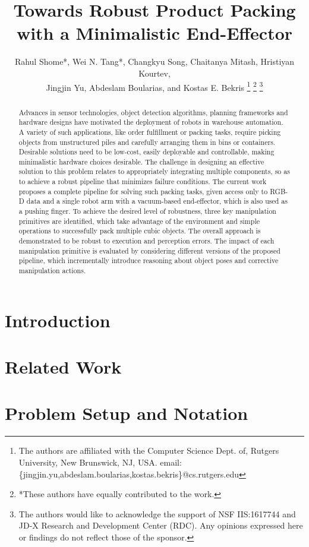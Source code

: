 \documentclass[letterpaper, 10 pt, conference]{Format/ieeeconf}  %
\title{\LARGE \bf
Towards Robust Product Packing with a Minimalistic End-Effector
}
\author{Rahul Shome*, Wei N. Tang*, Changkyu Song,  Chaitanya Mitash, Hristiyan Kourtev,\\  Jingjin Yu, Abdeslam Boularias, and Kostas E. Bekris%
\thanks{The authors are affiliated with the Computer Science Dept. of, Rutgers University, New Brunswick, NJ, USA. email:\{jingjin.yu,abdeslam.boularias,kostas.bekris\}@cs.rutgers.edu}%
\thanks{*These authors have equally contributed to the work.}%
\thanks{The authors would like to acknowledge the support of NSF IIS:1617744 and JD-X Research and Development Center (RDC). Any opinions expressed here or findings do not reflect those of the sponsor.}}
\begin{document}
\maketitle
\thispagestyle{empty}
\pagestyle{empty}

\vspace*{-4mm}
\begin{abstract}

Advances in sensor technologies, object detection algorithms, planning frameworks and hardware designs have motivated the deployment of robots in warehouse automation. A variety of such applications, like order fulfillment or packing tasks, require picking objects from unstructured piles and carefully arranging them in bins or containers. Desirable solutions need to be low-cost, easily deployable and controllable, making minimalistic hardware choices desirable. The challenge in designing an effective solution to this problem relates to appropriately integrating multiple components, so as to achieve a robust pipeline that minimizes failure conditions. The current work proposes a complete pipeline for solving such packing tasks, given access only to RGB-D data and a single robot arm with a vacuum-based end-effector, which is also used as a pushing finger. To achieve the desired level of robustness, three key manipulation primitives are identified, which take advantage of the environment and simple operations to successfully pack multiple cubic objects. The overall approach is demonstrated to be robust to execution and perception errors. The impact of each manipulation primitive is evaluated by considering different versions of the proposed pipeline, which incrementally introduce reasoning about object poses and corrective manipulation actions.

\end{abstract}


\section{Introduction}
\label{section:introduction}


\section{Related Work}
\label{section:related}


\section{Problem Setup and Notation}
\label{section:problem}

\end{document}
